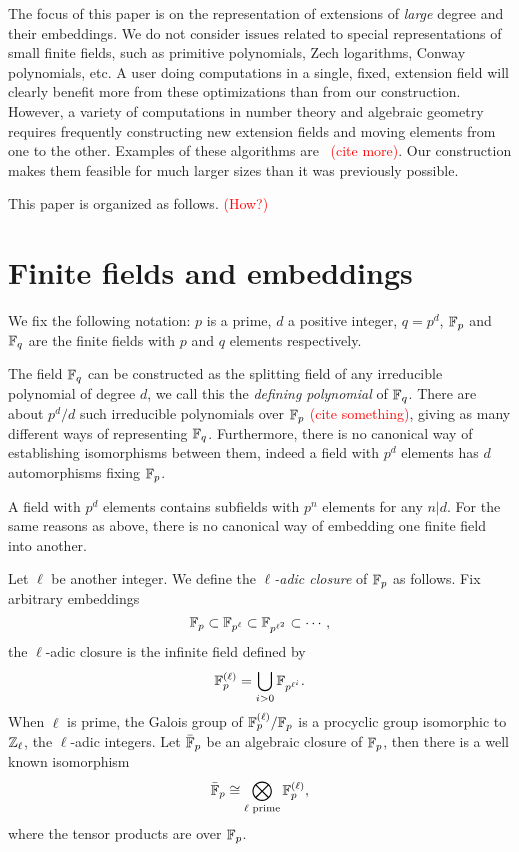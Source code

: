 \documentclass{sig-alternate}
\newcommand{\todo}[1]{\textcolor{red}{(#1)}}
\begin{document}
The focus of this paper is on the representation of extensions of
\emph{large} degree and their embeddings. We do not consider issues
related to special representations of small finite fields, such as
primitive polynomials, Zech logarithms, Conway polynomials, etc. A
user doing computations in a single, fixed, extension field will
clearly benefit more from these optimizations than from our
construction. However, a variety of computations in number theory and
algebraic geometry requires frequently constructing new extension
fields and moving elements from one to the other. Examples of these
algorithms are~\cite{df10} \todo{cite more}. Our construction makes
them feasible for much larger sizes than it was previously possible.

This paper is organized as follows. \todo{How?}


\section{Finite fields and embeddings}
\label{sec:finite-field-embedd}
We fix the following notation: $p$ is a prime, $d$ a positive integer,
$q=p^d$, $\mathbb{F}_p$ and $\mathbb{F}_q$ are the finite fields with $p$ and $q$
elements respectively.

The field $\mathbb{F}_q$ can be constructed as the splitting field of any
irreducible polynomial of degree $d$, we call this the \emph{defining
  polynomial} of $\mathbb{F}_q$. There are about $p^d/d$ such irreducible
polynomials over $\mathbb{F}_p$ \todo{cite something}, giving as many
different ways of representing $\mathbb{F}_q$. Furthermore, there is no
canonical way of establishing isomorphisms between them, indeed a
field with $p^d$ elements has $d$ automorphisms fixing $\mathbb{F}_p$.

A field with $p^d$ elements contains subfields with $p^n$ elements for
any $n|d$. For the same reasons as above, there is no canonical way of
embedding one finite field into another.

Let $\ell$ be another integer. We define the \emph{$\ell$-adic
  closure} of $\mathbb{F}_p$ as follows. Fix arbitrary embeddings
\begin{equation*}
  \mathbb{F}_p \subset \mathbb{F}_{p^\ell} \subset \mathbb{F}_{p^{\ell^2}} \subset \cdots,
\end{equation*}
the $\ell$-adic closure is the infinite field defined by
\begin{equation*}
  \mathbb{F}_p^{(\ell)} = \bigcup_{i>0}\mathbb{F}_{p^{\ell^i}}.
\end{equation*}
When $\ell$ is prime, the Galois group of $\mathbb{F}_p^{(\ell)}/\mathbb{F}_p$ is a
procyclic group isomorphic to $\mathbb{Z}_\ell$, the $\ell$-adic integers. Let
$\bar{\mathbb{F}}_p$ be an algebraic closure of $\mathbb{F}_p$, then there is a well
known isomorphism
\begin{equation}
  \label{eq:tensor}
  \bar{\mathbb{F}}_p \cong \bigotimes_{\ell\text{ prime}} \mathbb{F}_p^{(\ell)},
\end{equation}
where the tensor products are over $\mathbb{F}_p$.
\end{document}
